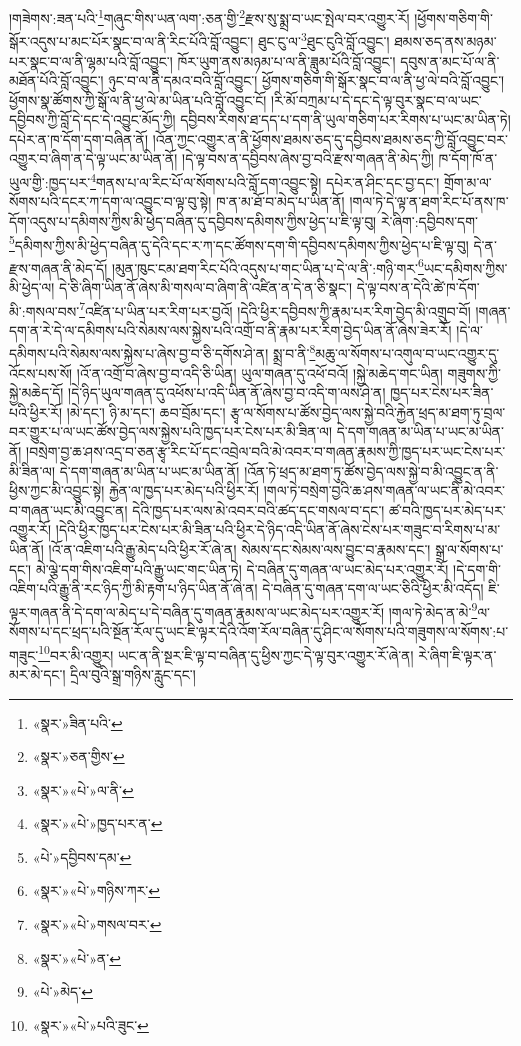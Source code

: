།གཟེགས་:ཟན་པའི་\footnote{«སྣར་»ཟིན་པའི་}གཞུང་གིས་ཡན་ལག་:ཅན་གྱི་\footnote{«སྣར་»ཅན་གྱིས་}རྫས་སུ་སྨྲ་བ་ཡང་སྤེལ་བར་འགྱུར་རོ། །ཕྱོགས་གཅིག་གི་སྒོར་འདུས་པ་མང་པོར་སྣང་བ་ལ་ནི་རིང་པོའི་བློ་འབྱུང་། ཐུང་ངུ་ལ་\footnote{«སྣར་»«པེ་»ལ་ནི་}ཐུང་ངུའི་བློ་འབྱུང་། ཐམས་ཅད་ནས་མཉམ་པར་སྣང་བ་ལ་ནི་ལྷམ་པའི་བློ་འབྱུང་། ཁོར་ཡུག་ནས་མཉམ་པ་ལ་ནི་ཟླུམ་པོའི་བློ་འབྱུང་། དབུས་ན་མང་པོ་ལ་ནི་མཐོན་པོའི་བློ་འབྱུང་། ཉུང་བ་ལ་ནི་དམའ་བའི་བློ་འབྱུང་། ཕྱོགས་གཅིག་གི་སྒོར་སྣང་བ་ལ་ནི་ཕྱ་ལེ་བའི་བློ་འབྱུང་། ཕྱོགས་སྣ་ཚོགས་ཀྱི་སྒོ་ལ་ནི་ཕྱ་ལེ་མ་ཡིན་པའི་བློ་འབྱུང་ངོ། །རི་མོ་བཀྲམ་པ་དེ་དང་དེ་ལྟ་བུར་སྣང་བ་ལ་ཡང་དབྱིབས་ཀྱི་བློ་དེ་དང་དེ་འབྱུང་མོད་ཀྱི། དབྱིབས་རིགས་ཐ་དད་པ་དག་ནི་ཡུལ་གཅིག་པར་རིགས་པ་ཡང་མ་ཡིན་ཏེ། དཔེར་ན་ཁ་དོག་དག་བཞིན་ནོ། །འོན་ཀྱང་འགྱུར་ན་ནི་ཕྱོགས་ཐམས་ཅད་དུ་དབྱིབས་ཐམས་ཅད་ཀྱི་བློ་འབྱུང་བར་འགྱུར་བ་ཞིག་ན་དེ་ལྟ་ཡང་མ་ཡིན་ནོ། །དེ་ལྟ་བས་ན་དབྱིབས་ཞེས་བྱ་བའི་རྫས་གཞན་ནི་མེད་ཀྱི། ཁ་དོག་ཁོ་ན་ཡུལ་གྱི་:ཁྱད་པར་\footnote{«སྣར་»«པེ་»ཁྱད་པར་ན་}གནས་པ་ལ་རིང་པོ་ལ་སོགས་པའི་བློ་དག་འབྱུང་སྟེ། དཔེར་ན་ཤིང་དང་བྱ་དང་། གྲོག་མ་ལ་སོགས་པའི་དངར་ཀ་དག་ལ་འབྱུང་བ་ལྟ་བུ་སྟེ། ཁ་ན་མ་ཐོ་བ་མེད་པ་ཡིན་ནོ། །གལ་ཏེ་དེ་ལྟ་ན་ཐག་རིང་པོ་ནས་ཁ་དོག་འདུས་པ་དམིགས་ཀྱིས་མི་ཕྱེད་བཞིན་དུ་དབྱིབས་དམིགས་ཀྱིས་ཕྱེད་པ་ཇི་ལྟ་བུ། རེ་ཞིག་:དབྱིབས་དག་\footnote{«པེ་»དབྱིབས་དམ་}དམིགས་ཀྱིས་མི་ཕྱེད་བཞིན་དུ་དེའི་དང་ར་ཀ་དང་ཚོགས་དག་གི་དབྱིབས་དམིགས་ཀྱིས་ཕྱེད་པ་ཇི་ལྟ་བུ། དེ་ན་རྫས་གཞན་ནི་མེད་དོ། །མུན་ཁུང་ངམ་ཐག་རིང་པོའི་འདུས་པ་གང་ཡིན་པ་དེ་ལ་ནི་:གཉི་གར་\footnote{«སྣར་»«པེ་»གཉིས་ཀར་}ཡང་དམིགས་ཀྱིས་མི་ཕྱེད་ལ། དེ་ཅི་ཞིག་ཡིན་ནོ་ཞེས་མི་གསལ་བ་ཞིག་ནི་འཛིན་ན་དེ་ན་ཅི་སྣང་། དེ་ལྟ་བས་ན་དེའི་ཚེ་ཁ་དོག་མི་:གསལ་བས་\footnote{«སྣར་»«པེ་»གསལ་བར་}འཛིན་པ་ཡིན་པར་རིག་པར་བྱའོ། །དེའི་ཕྱིར་དབྱིབས་ཀྱི་རྣམ་པར་རིག་བྱེད་མི་འགྲུབ་བོ། །གཞན་དག་ན་རེ་དེ་ལ་དམིགས་པའི་སེམས་ལས་སྐྱེས་པའི་འགྲོ་བ་ནི་རྣམ་པར་རིག་བྱེད་ཡིན་ནོ་ཞེས་ཟེར་རོ། །དེ་ལ་དམིགས་པའི་སེམས་ལས་སྐྱེས་པ་ཞེས་བྱ་བ་ཅི་དགོས་ཤེ་ན། སྨྲ་བ་ནི་\footnote{«སྣར་»«པེ་»ན་}མཆུ་ལ་སོགས་པ་འགུལ་བ་ཡང་འགྱུར་དུ་འོངས་པས་སོ། །འོ་ན་འགྲོ་བ་ཞེས་བྱ་བ་འདི་ཅི་ཡིན། ཡུལ་གཞན་དུ་འཕོ་བའོ། །སྐྱེ་མཆེད་གང་ཡིན། གཟུགས་ཀྱི་སྐྱེ་མཆེད་དོ། །དེ་ཉིད་ཡུལ་གཞན་དུ་འཕོས་པ་འདི་ཡིན་ནོ་ཞེས་བྱ་བ་འདི་ག་ལས་ཤེ་ན། ཁྱད་པར་ངེས་པར་ཟིན་པའི་ཕྱིར་རོ། །མེ་དང་། ཉི་མ་དང་། ཆབ་བྲོམ་དང་། རྩྭ་ལ་སོགས་པ་ཚོས་བྱེད་ལས་སྐྱེ་བའི་རྐྱེན་ཕྲད་མ་ཐག་ཏུ་བྲལ་བར་གྱུར་པ་ལ་ཡང་ཚོས་བྱེད་ལས་སྐྱེས་པའི་ཁྱད་པར་ངེས་པར་མི་ཟིན་ལ། དེ་དག་གཞན་མ་ཡིན་པ་ཡང་མ་ཡིན་ནོ། །བསྲེག་བྱ་ཆ་ཤས་འདྲ་བ་ཅན་རྩྭ་རིང་པོ་དང་འབྲེལ་བའི་མེ་འབར་བ་གཞན་རྣམས་ཀྱི་ཁྱད་པར་ཡང་ངེས་པར་མི་ཟིན་ལ། དེ་དག་གཞན་མ་ཡིན་པ་ཡང་མ་ཡིན་ནོ། །འོན་ཏེ་ཕྲད་མ་ཐག་ཏུ་ཚོས་བྱེད་ལས་སྐྱེ་བ་མི་འབྱུང་ན་ནི་ཕྱིས་ཀྱང་མི་འབྱུང་སྟེ། རྐྱེན་ལ་ཁྱད་པར་མེད་པའི་ཕྱིར་རོ། །གལ་ཏེ་བསྲེག་བྱའི་ཆ་ཤས་གཞན་ལ་ཡང་ནི་མེ་འབར་བ་གཞན་ཡང་མི་འབྱུང་ན། དེའི་ཁྱད་པར་ལས་མེ་འབར་བའི་ཚད་དང་གསལ་བ་དང་། ཚ་བའི་ཁྱད་པར་མེད་པར་འགྱུར་རོ། །དེའི་ཕྱིར་ཁྱད་པར་ངེས་པར་མི་ཟིན་པའི་ཕྱིར་དེ་ཉིད་འདི་ཡིན་ནོ་ཞེས་ངེས་པར་གཟུང་བ་རིགས་པ་མ་ཡིན་ནོ། །འོ་ན་འཇིག་པའི་རྒྱུ་མེད་པའི་ཕྱིར་རོ་ཞེ་ན། སེམས་དང་སེམས་ལས་བྱུང་བ་རྣམས་དང་། སྒྲ་ལ་སོགས་པ་དང་། མེ་ལྕེ་དག་གིས་འཇིག་པའི་རྒྱུ་ཡང་གང་ཡིན་ཏེ། དེ་བཞིན་དུ་གཞན་ལ་ཡང་མེད་པར་འགྱུར་རོ། །དེ་དག་གི་འཇིག་པའི་རྒྱུ་ནི་རང་ཉིད་ཀྱི་མི་རྟག་པ་ཉིད་ཡིན་ནོ་ཞེ་ན། དེ་བཞིན་དུ་གཞན་དག་ལ་ཡང་ཅིའི་ཕྱིར་མི་འདོད། ཇི་ལྟར་གཞན་ནི་དེ་དག་ལ་མེད་པ་དེ་བཞིན་དུ་གཞན་རྣམས་ལ་ཡང་མེད་པར་འགྱུར་རོ། །གལ་ཏེ་མེད་ན་མེ་\footnote{«པེ་»མེད་}ལ་སོགས་པ་དང་ཕྲད་པའི་སྔོན་རོལ་དུ་ཡང་ཇི་ལྟར་དེའི་འོག་རོལ་བཞིན་དུ་ཤིང་ལ་སོགས་པའི་གཟུགས་ལ་སོགས་:པ་གཟུང་\footnote{«སྣར་»«པེ་»པའི་ཟུང་}བར་མི་འགྱུར། ཡང་ན་ནི་སྔར་ཇི་ལྟ་བ་བཞིན་དུ་ཕྱིས་ཀྱང་དེ་ལྟ་བུར་འགྱུར་རོ་ཞེ་ན། རེ་ཞིག་ཇི་ལྟར་ན་མར་མེ་དང་། དྲིལ་བུའི་སྒྲ་གཉིས་རླུང་དང་། 